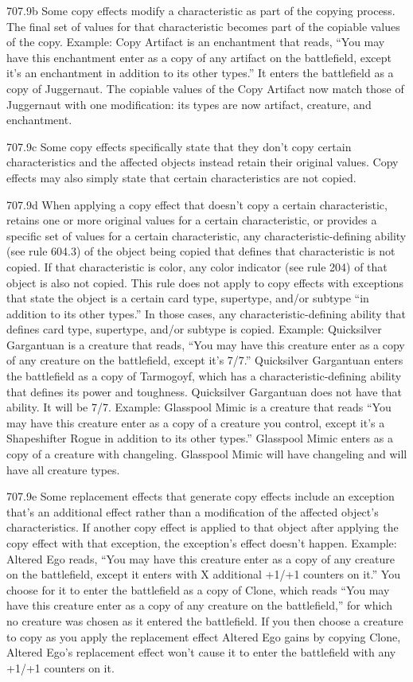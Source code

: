 707.9b Some copy effects modify a characteristic as part of the copying process. The final set of values for that characteristic becomes part of the copiable values of the copy.
Example: Copy Artifact is an enchantment that reads, “You may have this enchantment enter as a copy of any artifact on the battlefield, except it’s an enchantment in addition to its other types.” It enters the battlefield as a copy of Juggernaut. The copiable values of the Copy Artifact now match those of Juggernaut with one modification: its types are now artifact, creature, and enchantment.

707.9c Some copy effects specifically state that they don’t copy certain characteristics and the affected objects instead retain their original values. Copy effects may also simply state that certain characteristics are not copied.

707.9d When applying a copy effect that doesn’t copy a certain characteristic, retains one or more original values for a certain characteristic, or provides a specific set of values for a certain characteristic, any characteristic-defining ability (see rule 604.3) of the object being copied that defines that characteristic is not copied. If that characteristic is color, any color indicator (see rule 204) of that object is also not copied. This rule does not apply to copy effects with exceptions that state the object is a certain card type, supertype, and/or subtype “in addition to its other types.” In those cases, any characteristic-defining ability that defines card type, supertype, and/or subtype is copied.
Example: Quicksilver Gargantuan is a creature that reads, “You may have this creature enter as a copy of any creature on the battlefield, except it’s 7/7.” Quicksilver Gargantuan enters the battlefield as a copy of Tarmogoyf, which has a characteristic-defining ability that defines its power and toughness. Quicksilver Gargantuan does not have that ability. It will be 7/7.
Example: Glasspool Mimic is a creature that reads “You may have this creature enter as a copy of a creature you control, except it’s a Shapeshifter Rogue in addition to its other types.” Glasspool Mimic enters as a copy of a creature with changeling. Glasspool Mimic will have changeling and will have all creature types.

707.9e Some replacement effects that generate copy effects include an exception that’s an additional effect rather than a modification of the affected object’s characteristics. If another copy effect is applied to that object after applying the copy effect with that exception, the exception’s effect doesn’t happen.
Example: Altered Ego reads, “You may have this creature enter as a copy of any creature on the battlefield, except it enters with X additional +1/+1 counters on it.” You choose for it to enter the battlefield as a copy of Clone, which reads “You may have this creature enter as a copy of any creature on the battlefield,” for which no creature was chosen as it entered the battlefield. If you then choose a creature to copy as you apply the replacement effect Altered Ego gains by copying Clone, Altered Ego’s replacement effect won’t cause it to enter the battlefield with any +1/+1 counters on it.

